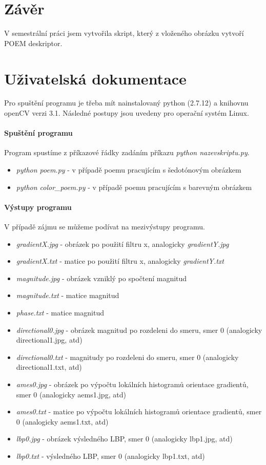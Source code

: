 \documentclass{report}
\begin{document}
\chapter{Závěr}
V semestrální práci jsem vytvořila skript, který z vloženého obrázku vytvoří POEM deskriptor. 

\chapter{Uživatelská dokumentace}
Pro spuštění programu je třeba mít nainstalovaný python (2.7.12) a knihovnu openCV verzi 3.1. Následné postupy jsou uvedeny pro operační systém Linux.

\subsubsection{Spuštění programu}
Program spustíme z příkazové řádky zadáním příkazu \textit{python nazevskriptu.py}. 
\begin{itemize}
	\item \textit{python poem.py} - v případě poemu pracujícím s šedotónovým obrázkem
	\item \textit{python color\_poem.py} - v případě poemu pracujícím s barevným obrázkem
\end{itemize}

\subsubsection{Výstupy programu}
V případě zájmu se můžeme podívat na mezivýstupy programu.
\begin{itemize}
	\item \textit{gradientX.jpg} - obrázek po použití filtru x, analogicky \textit{gradientY.jpg}
	\item \textit{gradientX.txt} - matice po použití filtru x, analogicky \textit{gradientY.txt} 
	\item \textit{magnitude.jpg} - obrázek vzniklý po spočtení magnitud
	\item \textit{magnitude.txt} - matice magnitud 
	\item \textit{phase.txt} - matice magnitud 
	\item \textit{directional0.jpg} - obrázek magnitud po rozdeleni do smeru, smer 0 (analogicky directional1.jpg, atd)
	\item \textit{directional0.txt} - magnitudy po rozdeleni do smeru, smer 0 (analogicky directional1.txt, atd)
	\item \textit{ames0.jpg} - obrázek po výpočtu lokálních histogramů orientace gradientů, smer 0 (analogicky aems1.jpg, atd)
	\item \textit{ames0.txt} - matice po výpočtu lokálních histogramů orientace gradientů, smer 0 (analogicky aems1.txt, atd)
	\item \textit{lbp0.jpg} - obrázek výsledného LBP, smer 0 (analogicky lbp1.jpg, atd)
	\item \textit{lbp0.txt} - výsledného LBP, smer 0 (analogicky lbp1.txt, atd)
\end{itemize}
\end{document}
